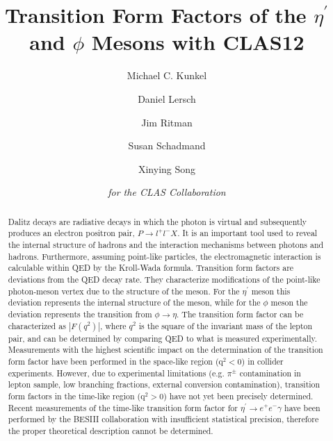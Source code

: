 \documentclass{aip-cp}
\def\etaP{\eta^{\prime}}
\begin{document}
\title{Transition Form Factors of the $\eta^{\prime}$ and $\phi$ Mesons with CLAS12}
\author[aff1]{Michael C. Kunkel}
\author[aff1]{Daniel Lersch}
\author[aff1]{Jim Ritman}
\author[aff1]{Susan Schadmand}
\author[aff1]{Xinying Song}
\author{\textit{for the CLAS Collaboration}}
\maketitle

\begin{abstract}
Dalitz decays are radiative decays in which the photon is virtual and subsequently produces an electron positron pair, $P\rightarrow l^+l^-X$. It is an important tool used to reveal the internal structure of hadrons and the interaction mechanisms between photons and hadrons. Furthermore, assuming point-like particles, the electromagnetic interaction is calculable within QED by the Kroll-Wada formula. Transition form factors are deviations from the QED decay rate. They characterize modifications of the point-like photon-meson vertex due to the structure of the meson. For the $\etaP$ meson this deviation represents the internal structure of the meson, while for the $\phi$ meson the deviation represents the transition from $\phi \to \eta$. The transition form factor can be characterized as $\left| F(q^2)\right|$, where $q^2$ is the square of the invariant mass of the lepton pair, and can be determined by comparing QED to what is measured experimentally.
 \\ 
 \indent Measurements with the highest scientific impact on the determination of the transition form factor have been performed in the space-like region ($\mathrm{q}^2<0$) in collider experiments. However, due to experimental limitations (e.g. $\pi^{\pm}$ contamination in lepton sample, low branching fractions, external conversion contamination), transition form factors in the time-like region ($\mathrm{q}^2>0$) have not yet been precisely determined. Recent measurements of the time-like transition form factor for $\etaP \to e^+e^- \gamma$ have been performed by the BESIII collaboration with insufficient statistical precision, therefore the proper theoretical description cannot be determined. 
\\

\end{abstract}
\end{document}
